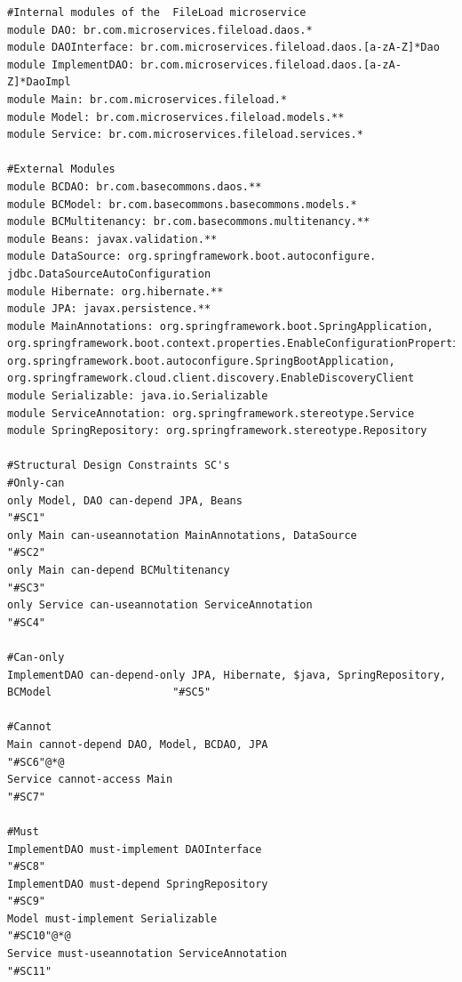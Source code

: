 \documentclass[12pt]{article}
\begin{document}
\begin{lstlisting}[style=colorido, caption={\textcolor{blue}{FileLoad microservice's architectural project specification.}},label={list:especArquiteturalFileLoad}
]
#Internal modules of the  FileLoad microservice
module DAO: br.com.microservices.fileload.daos.*
module DAOInterface: br.com.microservices.fileload.daos.[a-zA-Z]*Dao
module ImplementDAO: br.com.microservices.fileload.daos.[a-zA-Z]*DaoImpl
module Main: br.com.microservices.fileload.*
module Model: br.com.microservices.fileload.models.**
module Service: br.com.microservices.fileload.services.*

#External Modules
module BCDAO: br.com.basecommons.daos.**
module BCModel: br.com.basecommons.basecommons.models.*
module BCMultitenancy: br.com.basecommons.multitenancy.**
module Beans: javax.validation.**
module DataSource: org.springframework.boot.autoconfigure.
jdbc.DataSourceAutoConfiguration
module Hibernate: org.hibernate.**
module JPA: javax.persistence.**
module MainAnnotations: org.springframework.boot.SpringApplication, 
org.springframework.boot.context.properties.EnableConfigurationProperties, org.springframework.boot.autoconfigure.SpringBootApplication, org.springframework.cloud.client.discovery.EnableDiscoveryClient
module Serializable: java.io.Serializable
module ServiceAnnotation: org.springframework.stereotype.Service
module SpringRepository: org.springframework.stereotype.Repository

#Structural Design Constraints SC's
#Only-can 
only Model, DAO can-depend JPA, Beans																																													"#SC1"
only Main can-useannotation MainAnnotations, DataSource																											"#SC2"
only Main can-depend BCMultitenancy																																															"#SC3"
only Service can-useannotation ServiceAnnotation																																		"#SC4"

#Can-only
ImplementDAO can-depend-only JPA, Hibernate, $java, SpringRepository, BCModel					"#SC5"
	
#Cannot
Main cannot-depend DAO, Model, BCDAO, JPA 																																								"#SC6"@*@
Service cannot-access Main																																																								"#SC7"

#Must
ImplementDAO must-implement DAOInterface																																										"#SC8"
ImplementDAO must-depend SpringRepository																																									"#SC9"
Model must-implement Serializable																																																	"#SC10"@*@
Service must-useannotation ServiceAnnotation																																						"#SC11"
\end{lstlisting}
\end{document}
